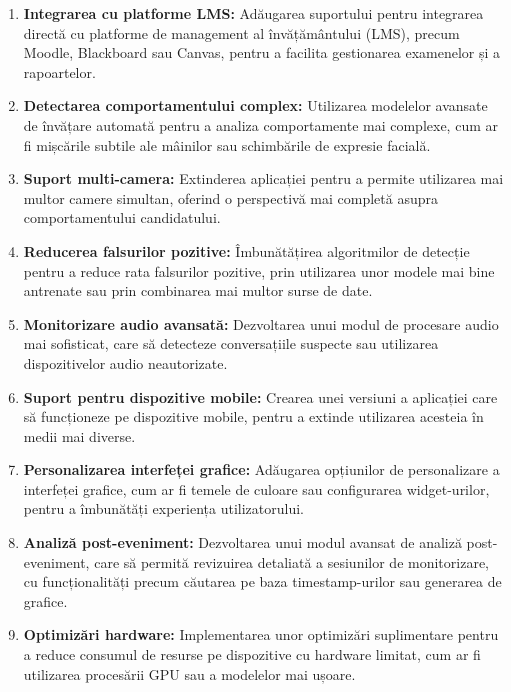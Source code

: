 \documentclass[12pt,a4paper]{article}
\begin{document}
\begin{enumerate}
    \item \textbf{Integrarea cu platforme LMS:} Adăugarea suportului pentru integrarea directă cu platforme de management al învățământului (LMS), precum Moodle, Blackboard sau Canvas, pentru a facilita gestionarea examenelor și a rapoartelor.

    \item \textbf{Detectarea comportamentului complex:} Utilizarea modelelor avansate de învățare automată pentru a analiza comportamente mai complexe, cum ar fi mișcările subtile ale mâinilor sau schimbările de expresie facială.

    \item \textbf{Suport multi-camera:} Extinderea aplicației pentru a permite utilizarea mai multor camere simultan, oferind o perspectivă mai completă asupra comportamentului candidatului.

    \item \textbf{Reducerea falsurilor pozitive:} Îmbunătățirea algoritmilor de detecție pentru a reduce rata falsurilor pozitive, prin utilizarea unor modele mai bine antrenate sau prin combinarea mai multor surse de date.

    \item \textbf{Monitorizare audio avansată:} Dezvoltarea unui modul de procesare audio mai sofisticat, care să detecteze conversațiile suspecte sau utilizarea dispozitivelor audio neautorizate.

    \item \textbf{Suport pentru dispozitive mobile:} Crearea unei versiuni a aplicației care să funcționeze pe dispozitive mobile, pentru a extinde utilizarea acesteia în medii mai diverse.

    \item \textbf{Personalizarea interfeței grafice:} Adăugarea opțiunilor de personalizare a interfeței grafice, cum ar fi temele de culoare sau configurarea widget-urilor, pentru a îmbunătăți experiența utilizatorului.

    \item \textbf{Analiză post-eveniment:} Dezvoltarea unui modul avansat de analiză post-eveniment, care să permită revizuirea detaliată a sesiunilor de monitorizare, cu funcționalități precum căutarea pe baza timestamp-urilor sau generarea de grafice.

    \item \textbf{Optimizări hardware:} Implementarea unor optimizări suplimentare pentru a reduce consumul de resurse pe dispozitive cu hardware limitat, cum ar fi utilizarea procesării GPU sau a modelelor mai ușoare.
\end{enumerate}
\end{document}
